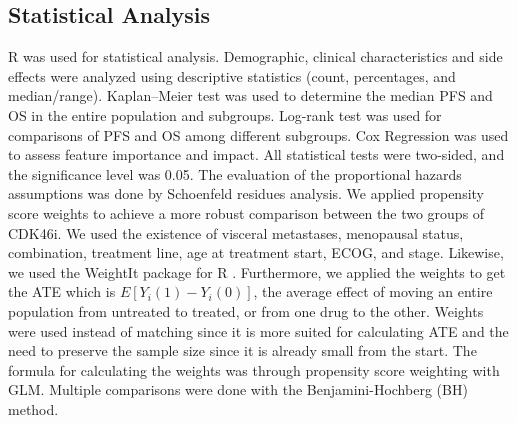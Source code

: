 \subsection{Statistical Analysis}
R was used for statistical analysis. Demographic, clinical characteristics and side effects were analyzed using descriptive statistics (count, percentages, and median/range). Kaplan–Meier test was used to determine the median PFS and OS in the entire population and subgroups. Log-rank test was used for comparisons of PFS and OS among different subgroups. Cox Regression was used to assess feature importance and impact. All statistical tests were two-sided, and the significance level was 0.05. The evaluation of the proportional hazards assumptions was done by Schoenfeld residues analysis.
We applied propensity score weights to achieve a more robust comparison between the two groups of CDK4\/6i. We used the existence of visceral metastases, menopausal status, combination, treatment line, age at treatment start, ECOG, and stage. Likewise, we used the WeightIt package for R \cite{WeightIt}. Furthermore, we applied the weights to get the ATE which is $E[Y_i(1)-Y_i(0)]$, the average effect of moving an entire population from untreated to treated, or from one drug to the other. Weights were used instead of matching since it is more suited for calculating ATE and the need to preserve the sample size since it is already small from the start. The formula for calculating the weights was through propensity score weighting with GLM. Multiple comparisons were done with the Benjamini-Hochberg (BH) method. 





